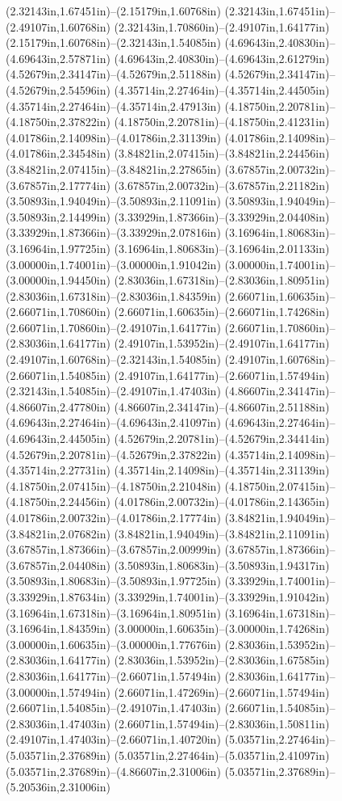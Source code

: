 (2.32143in,1.67451in)--(2.15179in,1.60768in) (2.32143in,1.67451in)--(2.49107in,1.60768in) (2.32143in,1.70860in)--(2.49107in,1.64177in) (2.15179in,1.60768in)--(2.32143in,1.54085in) (4.69643in,2.40830in)--(4.69643in,2.57871in) (4.69643in,2.40830in)--(4.69643in,2.61279in) (4.52679in,2.34147in)--(4.52679in,2.51188in) (4.52679in,2.34147in)--(4.52679in,2.54596in) (4.35714in,2.27464in)--(4.35714in,2.44505in) (4.35714in,2.27464in)--(4.35714in,2.47913in) (4.18750in,2.20781in)--(4.18750in,2.37822in) (4.18750in,2.20781in)--(4.18750in,2.41231in) (4.01786in,2.14098in)--(4.01786in,2.31139in) (4.01786in,2.14098in)--(4.01786in,2.34548in) (3.84821in,2.07415in)--(3.84821in,2.24456in) (3.84821in,2.07415in)--(3.84821in,2.27865in) (3.67857in,2.00732in)--(3.67857in,2.17774in) (3.67857in,2.00732in)--(3.67857in,2.21182in) (3.50893in,1.94049in)--(3.50893in,2.11091in) (3.50893in,1.94049in)--(3.50893in,2.14499in) (3.33929in,1.87366in)--(3.33929in,2.04408in) (3.33929in,1.87366in)--(3.33929in,2.07816in) (3.16964in,1.80683in)--(3.16964in,1.97725in) (3.16964in,1.80683in)--(3.16964in,2.01133in) (3.00000in,1.74001in)--(3.00000in,1.91042in) (3.00000in,1.74001in)--(3.00000in,1.94450in) (2.83036in,1.67318in)--(2.83036in,1.80951in) (2.83036in,1.67318in)--(2.83036in,1.84359in) (2.66071in,1.60635in)--(2.66071in,1.70860in) (2.66071in,1.60635in)--(2.66071in,1.74268in) (2.66071in,1.70860in)--(2.49107in,1.64177in) (2.66071in,1.70860in)--(2.83036in,1.64177in) (2.49107in,1.53952in)--(2.49107in,1.64177in) (2.49107in,1.60768in)--(2.32143in,1.54085in) (2.49107in,1.60768in)--(2.66071in,1.54085in) (2.49107in,1.64177in)--(2.66071in,1.57494in) (2.32143in,1.54085in)--(2.49107in,1.47403in) (4.86607in,2.34147in)--(4.86607in,2.47780in) (4.86607in,2.34147in)--(4.86607in,2.51188in) (4.69643in,2.27464in)--(4.69643in,2.41097in) (4.69643in,2.27464in)--(4.69643in,2.44505in) (4.52679in,2.20781in)--(4.52679in,2.34414in) (4.52679in,2.20781in)--(4.52679in,2.37822in) (4.35714in,2.14098in)--(4.35714in,2.27731in) (4.35714in,2.14098in)--(4.35714in,2.31139in) (4.18750in,2.07415in)--(4.18750in,2.21048in) (4.18750in,2.07415in)--(4.18750in,2.24456in) (4.01786in,2.00732in)--(4.01786in,2.14365in) (4.01786in,2.00732in)--(4.01786in,2.17774in) (3.84821in,1.94049in)--(3.84821in,2.07682in) (3.84821in,1.94049in)--(3.84821in,2.11091in) (3.67857in,1.87366in)--(3.67857in,2.00999in) (3.67857in,1.87366in)--(3.67857in,2.04408in) (3.50893in,1.80683in)--(3.50893in,1.94317in) (3.50893in,1.80683in)--(3.50893in,1.97725in) (3.33929in,1.74001in)--(3.33929in,1.87634in) (3.33929in,1.74001in)--(3.33929in,1.91042in) (3.16964in,1.67318in)--(3.16964in,1.80951in) (3.16964in,1.67318in)--(3.16964in,1.84359in) (3.00000in,1.60635in)--(3.00000in,1.74268in) (3.00000in,1.60635in)--(3.00000in,1.77676in) (2.83036in,1.53952in)--(2.83036in,1.64177in) (2.83036in,1.53952in)--(2.83036in,1.67585in) (2.83036in,1.64177in)--(2.66071in,1.57494in) (2.83036in,1.64177in)--(3.00000in,1.57494in) (2.66071in,1.47269in)--(2.66071in,1.57494in) (2.66071in,1.54085in)--(2.49107in,1.47403in) (2.66071in,1.54085in)--(2.83036in,1.47403in) (2.66071in,1.57494in)--(2.83036in,1.50811in) (2.49107in,1.47403in)--(2.66071in,1.40720in) (5.03571in,2.27464in)--(5.03571in,2.37689in) (5.03571in,2.27464in)--(5.03571in,2.41097in) (5.03571in,2.37689in)--(4.86607in,2.31006in) (5.03571in,2.37689in)--(5.20536in,2.31006in) 